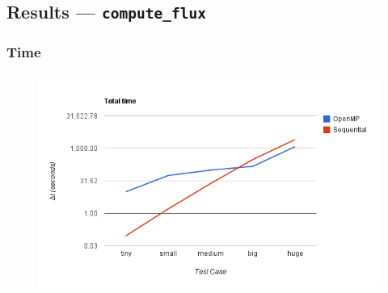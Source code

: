 \documentclass{beamer}
\begin{document}
\subsection{Results --- \texttt{compute\_flux}}
\begin{frame}
	\frametitle{Time}

\begin{figure}
\begin{center}
\includegraphics[width=\textwidth]{images/pfac/chrttime.png}
\end{center}
\end{figure}

\end{frame}
\end{document}
